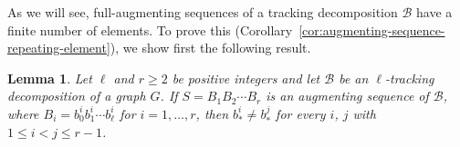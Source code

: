 \documentclass[12pt,reqno,a4paper]{amsart}
\newcommand{\verm}[1]{\textcolor{red}{#1}}
\newcommand{\azul}[1]{\textcolor{blue}{#1}}
\newtheorem{lemma}[theorem]{Lemma}
\newcommand{\B}{\mathcal{B}}
\begin{document}
%
As we will see,  full-augmenting sequences of a tracking
decomposition \(\B\) have a finite number of elements.  
To prove this
(Corollary~\ref{cor:augmenting-sequence-repeating-element}), 
we show first the following result.



\begin{lemma}\label{lemma:non-repeating}
Let \(\ell\) and $r\geq 2$ be positive integers 
and let \(\B\) be an \(\ell\)-tracking decomposition of a graph \(G\).
If \(S = B_1B_2\cdots B_r\) is an augmenting sequence of $\B$, where 
\(B_i=b_0^ib_1^i\cdots b_\ell^i\) for 
$i=1,\ldots,r$, then \(b^i_* \neq b^j_*\) for every $i$, $j$ with \(1\leq i<j\leq r-1\).
\end{lemma}
\end{document}
